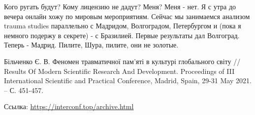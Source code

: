 Кого ругать будут? Кому лицензию не дадут? Меня? Меня - нет. Я с утра до вечера
онлайн хожу по мировым мероприятиям. Сейчас мы занимаемся анализом trauma
studies параллельно с Мадридом, Волгоградом, Петербургом и (пока я немного
подержу в секрете) - с Бразилией. Первые результаты дал Волгоград. Теперь -
Мадрид. Пилите, Шура, пилите, они не золотые. 

Більченко Є. В. Феномен травматичної пам'яті в культурі глобального світу //
Results Of Modern Scientific Research And Development. Proceedings of III
International Scientific and Practical Conference, Madrid, Spain,  29-31 May
2021. – С. 451-457.

Ссылка: \url{https://interconf.top/archive.html}
